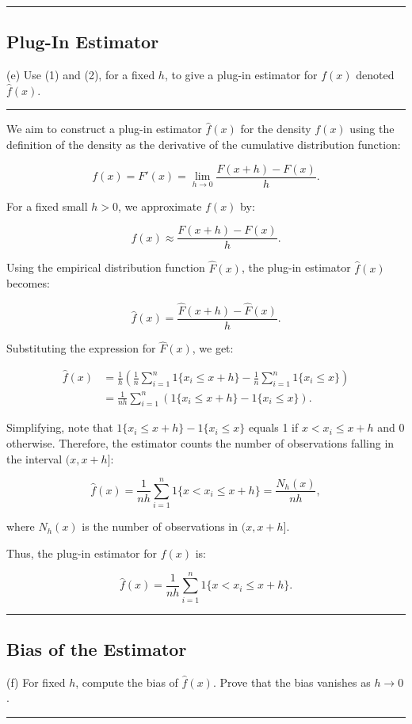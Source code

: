 \documentclass{article}
\newenvironment{colorparagraph}[1]{\par\color{#1}}{\par}
\begin{document}
\begin{colorparagraph}{questioncolor}
\label{q2e}
\rule{\textwidth}{0.5pt}
\subsection{Plug-In Estimator}
(e) Use (1) and (2), for a fixed \( h \), to give a plug-in estimator for \( f(x) \) denoted \( \hat{f}(x) \).

\rule{\textwidth}{0.5pt}
\end{colorparagraph}

We aim to construct a plug-in estimator \( \hat{f}(x) \) for the density \( f(x) \) using the definition of the density as the derivative of the cumulative distribution function:

\[
f(x) = F'(x) = \lim_{h \to 0} \frac{F(x + h) - F(x)}{h}.
\]

For a fixed small \( h > 0 \), we approximate \( f(x) \) by:

\[
f(x) \approx \frac{F(x + h) - F(x)}{h}.
\]

Using the empirical distribution function \( \hat{F}(x) \), the plug-in estimator \( \hat{f}(x) \) becomes:

\[
\hat{f}(x) = \frac{\hat{F}(x + h) - \hat{F}(x)}{h}.
\]

Substituting the expression for \( \hat{F}(x) \), we get:

\[
\begin{aligned}
\hat{f}(x) &= \frac{1}{h} \left( \frac{1}{n} \sum_{i=1}^n 1\{ x_i \leq x + h \} - \frac{1}{n} \sum_{i=1}^n 1\{ x_i \leq x \} \right) \\
&= \frac{1}{n h} \sum_{i=1}^n \left( 1\{ x_i \leq x + h \} - 1\{ x_i \leq x \} \right).
\end{aligned}
\]

Simplifying, note that \( 1\{ x_i \leq x + h \} - 1\{ x_i \leq x \} \) equals 1 if \( x < x_i \leq x + h \) and 0 otherwise. Therefore, the estimator counts the number of observations falling in the interval \( (x, x + h] \):

\[
\hat{f}(x) = \frac{1}{n h} \sum_{i=1}^n 1\{ x < x_i \leq x + h \} = \frac{N_h(x)}{n h},
\]

where \( N_h(x) \) is the number of observations in \( (x, x + h] \).

Thus, the plug-in estimator for \( f(x) \) is:

\[
\hat{f}(x) = \frac{1}{n h} \sum_{i=1}^n 1\{ x < x_i \leq x + h \}.
\]

\begin{colorparagraph}{questioncolor}
\label{q2f}
\rule{\textwidth}{0.5pt}
\subsection{Bias of the Estimator}
(f) For fixed \( h \), compute the bias of \( \hat{f}(x) \). Prove that the bias vanishes as \( h \to 0 \).

\rule{\textwidth}{0.5pt}
\end{colorparagraph}
\end{document}
